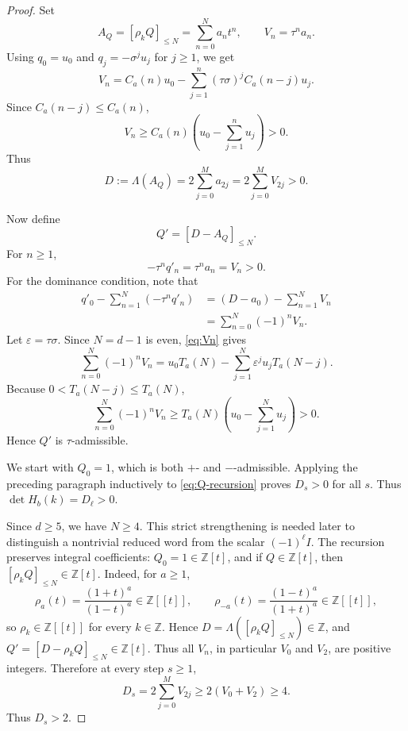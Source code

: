 \documentclass[a4paper,11pt]{amsart}
\theoremstyle{remark}
\newcommand{\Z}{\mathbb Z}
\numberwithin{equation}{section}
\begin{document}
\begin{proof}
Set
\[
        A_Q=[\rho_kQ]_{\le N}=\sum_{n=0}^{N}a_nt^n,
        \qquad
        V_n=\tau^n a_n.
\]
Using \(q_0=u_0\) and \(q_j=-\sigma^ju_j\) for \(j\ge1\), we get
\begin{equation}\label{eq:Vn}
        V_n
        =
        C_a(n)u_0
        -
        \sum_{j=1}^{n}(\tau\sigma)^jC_a(n-j)u_j.
\end{equation}
Since \(C_a(n-j)\le C_a(n)\),
\begin{equation}\label{eq:Vnpositive}
        V_n
        \ge
        C_a(n)\left(u_0-\sum_{j=1}^{n}u_j\right)>0.
\end{equation}
Thus
\[
        D:=\Lambda(A_Q)=2\sum_{j=0}^{M}a_{2j}
        =
        2\sum_{j=0}^{M}V_{2j}
        >0.
\]

Now define
\[
        Q'=[D-A_Q]_{\le N}.
\]
For \(n\ge1\),
\[
        -\tau^nq'_n=\tau^na_n=V_n>0.
\]
For the dominance condition, note that
\[
\begin{aligned}
        q'_0-\sum_{n=1}^{N}(-\tau^nq'_n)
        &=
        (D-a_0)-\sum_{n=1}^{N}V_n                 \\
        &=
        \sum_{n=0}^{N}(-1)^nV_n.
\end{aligned}
\]
Let \(\varepsilon=\tau\sigma\).  Since \(N=d-1\) is even, \eqref{eq:Vn} gives
\[
        \sum_{n=0}^{N}(-1)^nV_n
        =
        u_0T_a(N)
        -
        \sum_{j=1}^{N}\varepsilon^ju_jT_a(N-j).
\]
Because \(0<T_a(N-j)\le T_a(N)\),
\[
        \sum_{n=0}^{N}(-1)^nV_n
        \ge
        T_a(N)\left(u_0-\sum_{j=1}^{N}u_j\right)>0.
\]
Hence \(Q'\) is \(\tau\)-admissible.

We start with \(Q_0=1\), which is both \(+\)- and \(-\)-admissible.  Applying the preceding paragraph inductively to \eqref{eq:Q-recursion} proves \(D_s>0\) for all \(s\).  Thus \(\det H_b(k)=D_\ell>0\).

Since \(d\ge5\), we have \(N\ge4\).  This strict strengthening is needed later to distinguish a nontrivial reduced word from the scalar \((-1)^\ell I\).  The recursion preserves integral coefficients: \(Q_0=1\in\Z[t]\), and if \(Q\in\Z[t]\), then \([\rho_k Q]_{\le N}\in\Z[t]\).  Indeed, for \(a\ge1\),
\[
        \rho_a(t)=\frac{(1+t)^a}{(1-t)^a}\in\Z[[t]],
        \qquad
        \rho_{-a}(t)=\frac{(1-t)^a}{(1+t)^a}\in\Z[[t]],
\]
so \(\rho_k\in\Z[[t]]\) for every \(k\in\Z\).  Hence \(D=\Lambda([\rho_kQ]_{\le N})\in\Z\), and \(Q'=[D-\rho_kQ]_{\le N}\in\Z[t]\).  Thus all \(V_n\), in particular \(V_0\) and \(V_2\), are positive integers.  Therefore at every step \(s\ge1\),
\[
        D_s=2\sum_{j=0}^{M}V_{2j}\ge2(V_0+V_2)\ge4.
\]
Thus \(D_s>2\).
\end{proof}
\end{document}
